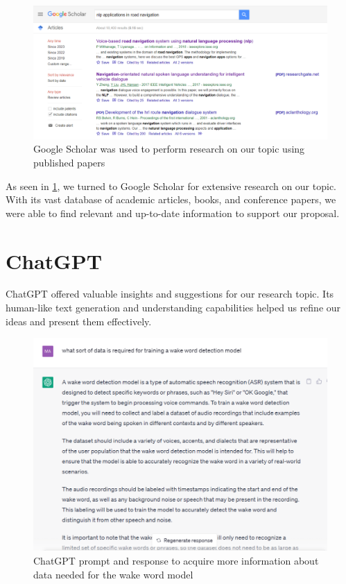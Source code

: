 \documentclass{epsrc}
\begin{document}
\begin{figure}[hbtp]
    \centering
    \includegraphics[width = 13.5cm]{google scholar.png}
    \caption{Google Scholar was used to perform research on our topic using published papers}
    \label{fig:GScholar}
\end{figure}
\vspace{5pt}

As seen in \ref{fig:GScholar}, we turned to Google Scholar for extensive research on our topic. With its vast database of academic articles, books, and conference papers, we were able to find relevant and up-to-date information to support our proposal.
\vspace{5pt}

\section{ChatGPT}
\vspace{5pt}

ChatGPT offered valuable insights and suggestions for our research topic. Its human-like text generation and understanding capabilities helped us refine our ideas and present them effectively.
\vspace{5pt}

\begin{figure}[hbtp]
    \centering
    \includegraphics[width = 13.5cm]{WakeWord.png}
    \caption{ChatGPT prompt and response to acquire more information about data needed for the wake word model}
    \label{fig:wakeword}
\end{figure}
\vspace{5pt}
\end{document}
